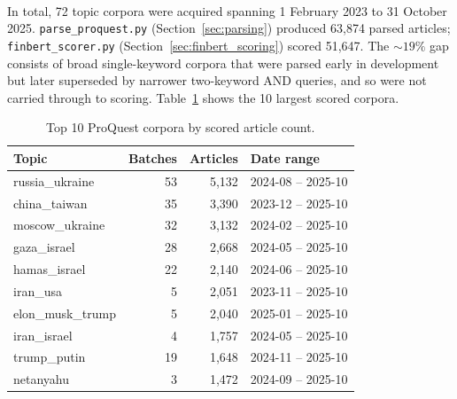 \documentclass[11pt]{article}
\newcommand{\inputsection}[1]{}
\begin{document}
\paragraph{} In total, 72 topic corpora were acquired spanning
1 February 2023 to 31 October 2025. \texttt{parse\_proquest.py}
(Section~\ref{sec:parsing}) produced 63{,}874 parsed articles;
\texttt{finbert\_scorer.py} (Section~\ref{sec:finbert_scoring})
scored 51{,}647. The ${\sim}19\%$ gap consists of broad
single-keyword corpora that were parsed early in development but
later superseded by narrower two-keyword AND queries, and so were
not carried through to scoring. Table~\ref{tab:corpus_sizes} shows
the 10 largest scored corpora.

\begin{table}[H]
\centering
\caption{Top 10 ProQuest corpora by scored article count.}
\label{tab:corpus_sizes}
\small
\begin{tabularx}{\textwidth}{X r r l}
\toprule
\textbf{Topic} & \textbf{Batches} & \textbf{Articles} & \textbf{Date range} \\
\midrule
russia\_ukraine   & 53 & 5{,}132 & 2024-08 -- 2025-10 \\
china\_taiwan     & 35 & 3{,}390 & 2023-12 -- 2025-10 \\
moscow\_ukraine   & 32 & 3{,}132 & 2024-02 -- 2025-10 \\
gaza\_israel      & 28 & 2{,}668 & 2024-05 -- 2025-10 \\
hamas\_israel     & 22 & 2{,}140 & 2024-06 -- 2025-10 \\
iran\_usa         &  5 & 2{,}051 & 2023-11 -- 2025-10 \\
elon\_musk\_trump &  5 & 2{,}040 & 2025-01 -- 2025-10 \\
iran\_israel      &  4 & 1{,}757 & 2024-05 -- 2025-10 \\
trump\_putin      & 19 & 1{,}648 & 2024-11 -- 2025-10 \\
netanyahu         &  3 & 1{,}472 & 2024-09 -- 2025-10 \\
\bottomrule
\end{tabularx}
\end{table}







\newpage


\end{document}
